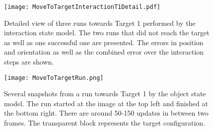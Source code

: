\begin{figure}
\centering
\texttt{[image: MoveToTargetInteractionT1Detail.pdf]}
\caption{Detailed view of three runs towards Target 1 performed by the interaction state model. The two runs that did not reach the target as well as one successful one are presented. The errors in position and orientation as well as the combined error over the interaction steps are shown.}
\label{fig:moveToTargetInteractionT1Detail}
\end{figure}

\begin{figure}
\centering
\texttt{[image: MoveToTargetRun.png]}
\caption{Several snapshots from a run towards Target 1 by the object state model.
The run started at the image at the top left and finished at the bottom right.
There are around 50-150 updates in between two frames. The transparent block represents the target configuration.}
\label{fig:moveToTargetRun}
\end{figure}


%
%






